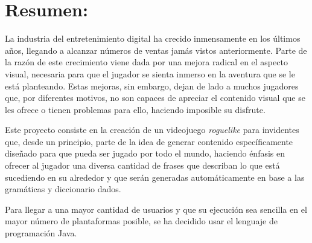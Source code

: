 \section*{Resumen:}

La industria del entretenimiento digital ha crecido inmensamente en los últimos años, llegando a alcanzar números de ventas jamás vistos anteriormente.
Parte de la razón de este crecimiento viene dada por una mejora radical en el aspecto visual, necesaria para que el jugador se sienta inmerso en la aventura que se le está planteando.
Estas mejoras, sin embargo, dejan de lado a muchos jugadores que, por diferentes motivos, no son capaces de apreciar el contenido visual que se les ofrece o tienen problemas para ello, haciendo imposible su disfrute.

Este proyecto consiste en la creación de un videojuego \textit{roguelike} para invidentes que, desde un principio, parte de la idea de generar contenido específicamente diseñado para que pueda ser jugado por todo el mundo, haciendo énfasis en ofrecer al jugador una diversa cantidad de frases que describan lo que está sucediendo en su alrededor y que serán generadas automáticamente en base a las gramáticas y diccionario dados.

Para llegar a una mayor cantidad de usuarios y que su ejecución sea sencilla en el mayor número de plantaformas posible, se ha decidido usar el lenguaje de programación Java.
